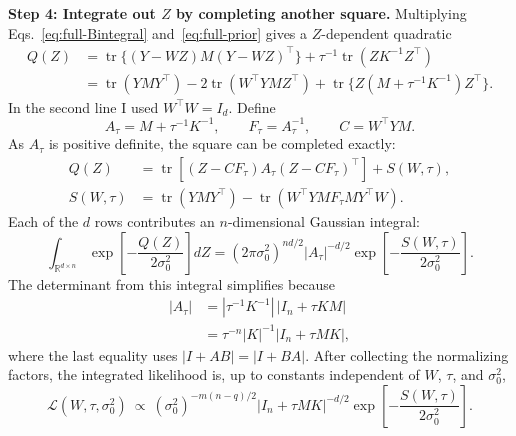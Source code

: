 \documentclass[11pt,letterpaper]{article}
\newcommand{\R}{\mathbb R}
\begin{document}
\textbf{Step 4: Integrate out $Z$ by completing another square.}
Multiplying Eqs.~\eqref{eq:full-Bintegral} and~\eqref{eq:full-prior} gives a $Z$-dependent quadratic
\begin{align}
Q(Z)&=\operatorname{tr}\{(Y-WZ)M(Y-WZ)^\top\}
+\tau^{-1}\operatorname{tr}(ZK^{-1}Z^\top)\\
&=\operatorname{tr}(YMY^\top)-2\operatorname{tr}(W^\top YMZ^\top)
+\operatorname{tr}\{Z(M+\tau^{-1}K^{-1})Z^\top\}.
\label{eq:full-Q}
\end{align}
In the second line I used $W^\top W=I_d$. Define
\begin{equation}
A_\tau=M+\tau^{-1}K^{-1},\qquad F_\tau=A_\tau^{-1},\qquad
C=W^\top YM.
\end{equation}
As $A_\tau$ is positive definite, the square can be completed exactly:
\begin{align}
Q(Z)
&=\operatorname{tr}\!\left[(Z-CF_\tau)A_\tau(Z-CF_\tau)^\top\right]+S(W,\tau),\\
S(W,\tau)
&=\operatorname{tr}(YMY^\top)
-\operatorname{tr}(W^\top YMF_\tau MY^\top W).
\label{eq:full-S}
\end{align}
Each of the $d$ rows contributes an $n$-dimensional Gaussian integral:
\begin{equation}
\int_{\R^{d\times n}}\exp\!\left[-\frac{Q(Z)}{2\sigma_0^2}\right]dZ
=(2\pi\sigma_0^2)^{nd/2}|A_\tau|^{-d/2}
\exp\!\left[-\frac{S(W,\tau)}{2\sigma_0^2}\right].
\end{equation}
The determinant from this integral simplifies because
\begin{align}
|A_\tau|
&=|\tau^{-1}K^{-1}|\,|I_n+\tau KM|\\
&=\tau^{-n}|K|^{-1}|I_n+\tau MK|,
\end{align}
where the last equality uses $|I+AB|=|I+BA|$. After collecting the normalizing factors, the integrated likelihood is, up to constants independent of $W$, $\tau$, and $\sigma_0^2$,
\begin{equation}
\boxed{\mathcal L(W,\tau,\sigma_0^2)\ \propto\
(\sigma_0^2)^{-m(n-q)/2}|I_n+\tau MK|^{-d/2}
\exp\!\left[-\frac{S(W,\tau)}{2\sigma_0^2}\right].}
\label{eq:full-marginal}
\end{equation}
\end{document}
